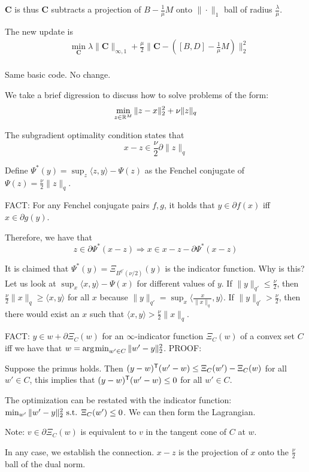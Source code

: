 \documentclass{article}
\begin{document}
$\mathbf{C}$ is thus $\mathbf{C}$ subtracts a projection of $B - \frac{1}{\mu} M$ onto $\|\cdot\|_1$ ball of radius $\frac{\lambda}{\mu}$.

The new update is 
\begin{align*}
& \min_{\mathbf{C}} \lambda \|\mathbf{C}\|_{\infty,1} + \frac{\mu}{2} \| \mathbf{C} - ([B,D] - \frac{1}{\mu} M ) \|_2^2 \\
\end{align*}

Same basic code. No change.

\begin{framed}
We take a brief digression to discuss how to solve problems of the form:
\[
\min_{z \in \mathbb{R}^M} \| z - x\|_2^2 + \nu \|z \|_q
\]

The subgradient optimality condition states that 
\[
x - z \in \frac{\nu}{2} \partial \| z \|_q
\]

Define $\Psi^*(y) = \sup_z \langle z, y \rangle - \Psi(z)$ as the Fenchel conjugate of $\Psi(z) = \frac{\nu}{2} \| z \|_q$. 

FACT: For any Fenchel conjugate pairs $f,g$, it holds that $y \in \partial f(x)$ iff $x \in \partial g(y)$.

Therefore, we have that 
\[
z \in \partial \Psi^*(x - z) \Rightarrow x \in x-z - \partial \Psi^*(x-z)
\]

It is claimed that $\Psi^*(y) = \Xi_{B^{q'}(\nu/2)}(y)$ is the indicator function. Why is this?
Let us look at $\sup_x \langle x, y\rangle - \Psi(x)$ for different values of $y$. If $\|y\|_{q'} \leq \frac{\nu}{2}$, then $\frac{\nu}{2} \|x\|_q \geq \langle x,y\rangle$ for all $x$ because $\|y\|_{q'} = \sup_x \langle \frac{x}{\|x\|_q},y\rangle $. 
If $\|y\|_{q'} > \frac{\nu}{2}$, then there would exist an $x$ such that $\langle x, y\rangle > \frac{\nu}{2} \|x\|_q$.

FACT: $y \in w + \partial \Xi_C(w)$ for an $\infty$-indicator function $\Xi_C(w)$ of a convex set $C$ iff we have that $w = \mathop{\rm arg\kern.2ex min}_{w' \in C} \|w' - y\|_2^2$. 
PROOF: 

Suppose the primus holds. Then $(y-w)^{\mathsf{T}} (w' - w) \leq \Xi_C(w') - \Xi_C(w)$ for all $w' \in C$, this implies that $(y-w)^{\mathsf{T}} (w' - w) \leq 0$ for all $w' \in C$. 

The optimization can be restated with the indicator function: $\min_{w'} \|w' - y \|_2^2 \textrm{ s.t. } \Xi_C(w') \leq 0$. We can then form the Lagrangian.

Note: $v \in \partial \Xi_C(w)$ is equivalent to $v$ in the tangent cone of $C$ at $w$.

In any case, we establish the connection. $x-z$ is the projection of $x$ onto the $\frac{\nu}{2}$ ball of the dual norm.

\end{framed}
\end{document}
